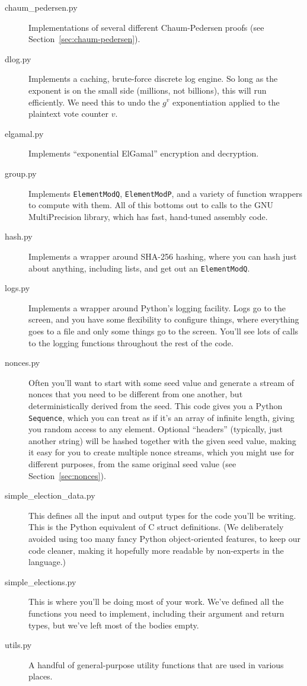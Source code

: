 \documentclass[letterpaper,12pt]{article}
\begin{document}
\begin{description}
\item[chaum\_pedersen.py] Implementations of several different Chaum-Pedersen proofs
  (see Section~\ref{sec:chaum-pedersen}).
\item [dlog.py] Implements a caching, brute-force discrete log engine.
  So long as the exponent is on the small side (millions, not
  billions), this will run efficiently. We need this to undo the
  $g^v$ exponentiation applied to the plaintext vote counter $v$.
\item [elgamal.py] Implements ``exponential ElGamal'' encryption and
  decryption.
\item [group.py] Implements {\tt ElementModQ}, {\tt ElementModP}, and
  a variety of function wrappers to compute with them. All of this
  bottoms out to calls to the GNU MultiPrecision library, which has
  fast, hand-tuned assembly code.
\item [hash.py] Implements a wrapper around SHA-256 hashing, where
  you can hash just about anything, including lists, and get out
  an {\tt ElementModQ}.
\item [logs.py] Implements a wrapper around Python's logging facility.
  Logs go to the screen, and you have some flexibility to configure
  things, where everything goes to a file and only some things go to
  the screen. You'll see lots of calls to the logging functions
  throughout the rest of the code.
\item [nonces.py] Often you'll want to start with some seed value
  and generate a stream of nonces that you need to be different from
  one another, but deterministically derived from the seed. This code
  gives you a Python {\tt Sequence}, which you can treat as if it's
  an array of infinite length, giving you random access to any element.
  Optional ``headers'' (typically, just another string) will be hashed
  together with the given seed value, making it easy for you to create
  multiple nonce streams, which you might use for different purposes,
  from the same original seed value (see Section~\ref{sec:nonces}).
\item [simple\_election\_data.py] This defines all the input and output
  types for the code you'll be writing. This is the Python equivalent
  of C struct definitions. (We deliberately avoided using too many
  fancy Python object-oriented features, to keep our code cleaner,
  making it hopefully more readable by non-experts in the language.)
\item [simple\_elections.py] This is where you'll be doing most of
  your work. We've defined all the functions you need to implement,
  including their argument and return types, but we've left most of
  the bodies empty.
\item [utils.py] A handful of general-purpose utility functions that are
  used in various places.
\end{description}
  
\end{document}
